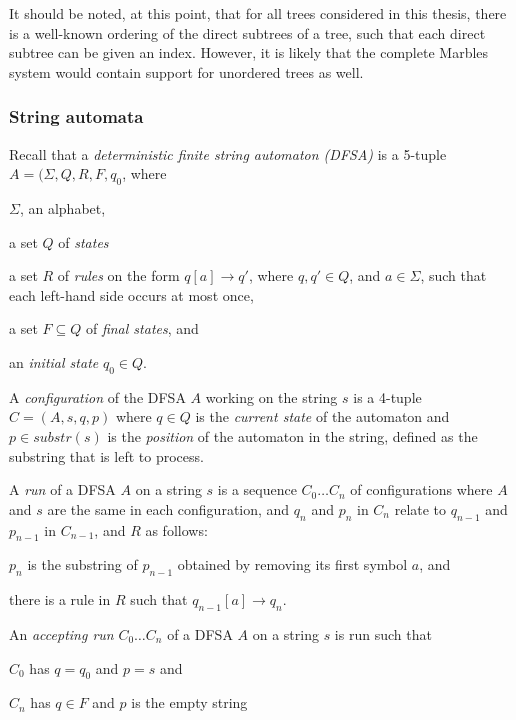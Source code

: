 It should be noted, at this point, that for all trees considered in this
thesis, there is a well-known ordering of the direct subtrees of a tree,
such that each direct subtree can be given an index. However, it is likely
that the complete Marbles system would contain support for unordered trees
as well. 

\subsubsection{String automata}
\label{ssec_fsa}

Recall that a \emph{deterministic finite string automaton (DFSA)} is a
5-tuple $A = (\Sigma, Q, R, F, q_0$, where
\begin{compactitem}
\item $\Sigma$, an alphabet,
\item a set $Q$ of \emph{states}
\item a set $R$ of \emph{rules} on the form
	$q[a] \rightarrow q'$, where $q, q' \in Q$, and $a \in \Sigma$, such
	that each left-hand side occurs at most once, 
\item a set $F \subseteq Q$ of \emph{final states}, and
\item an \emph{initial state} $q_0 \in Q$.
\end{compactitem}

A \emph{configuration} of the DFSA $A$ working on the string $s$ is a 4-tuple
$C = (A, s, q, p)$ where $q \in Q$ is the \emph{current state} of the
automaton and $p \in substr(s)$ is the \emph{position} of the automaton in
the string, defined as the substring that is left to process.

A \emph{run} of a DFSA $A$ on a string $s$ is a sequence $C_0 \ldots C_n$ of
configurations where $A$ and $s$ are the same in each configuration, and
$q_n$ and $p_n$ in $C_n$ relate to $q_{n-1}$ and $p_{n-1}$ in $C_{n-1}$,
and $R$ as follows:
\begin{compactitem}
\item $p_n$ is the substring of $p_{n-1}$ obtained by removing its first symbol
$a$, and
\item there is a rule in $R$ such that
$q_{n-1}[a] \rightarrow q_n$.
\end{compactitem}
\vspace{0.5cm}

An \emph{accepting run} $C_0 \ldots C_n$ of a DFSA $A$ on a string $s$ is run such that
\begin{compactitem}
\item $C_0$ has $q = q_0$ and $p = s$ and
\item $C_n$ has $q \in F$ and $p$ is the empty string
\end{compactitem}
\vspace{0.5cm}

